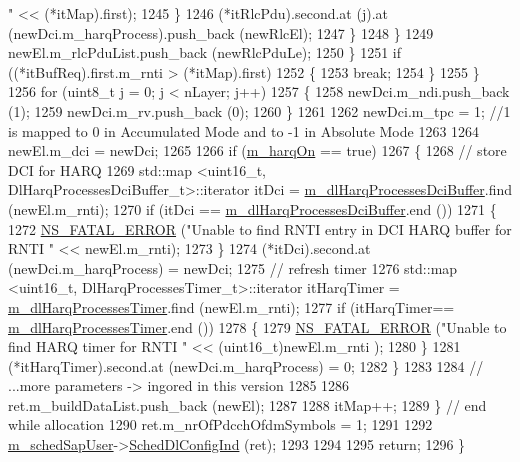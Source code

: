 \begin{DoxyCode}
{      "} << (*itMap).first);
1245                         \}
1246                       (*itRlcPdu).second.at (j).at (newDci.m\_harqProcess).push\_back (newRlcEl);
1247                     \}
1248                 \}
1249               newEl.m\_rlcPduList.push\_back (newRlcPduLe);
1250             \}
1251           \textcolor{keywordflow}{if} ((*itBufReq).first.m\_rnti > (*itMap).first)
1252             \{
1253               \textcolor{keywordflow}{break};
1254             \}
1255         \}
1256       \textcolor{keywordflow}{for} (uint8\_t j = 0; j < nLayer; j++)
1257         \{
1258           newDci.m\_ndi.push\_back (1);
1259           newDci.m\_rv.push\_back (0);
1260         \}
1261 
1262       newDci.m\_tpc = 1; \textcolor{comment}{//1 is mapped to 0 in Accumulated Mode and to -1 in Absolute Mode}
1263 
1264       newEl.m\_dci = newDci;
1265 
1266       \textcolor{keywordflow}{if} (\hyperlink{classns3_1_1FdMtFfMacScheduler_abc95b8f62ff797ff3fb9ed21322c5f35}{m\_harqOn} == \textcolor{keyword}{true})
1267         \{
1268           \textcolor{comment}{// store DCI for HARQ}
1269           std::map <uint16\_t, DlHarqProcessesDciBuffer\_t>::iterator itDci = 
      \hyperlink{classns3_1_1FdMtFfMacScheduler_a8c331acf0a47c5bfe7d8ac19db83d814}{m\_dlHarqProcessesDciBuffer}.find (newEl.m\_rnti);
1270           \textcolor{keywordflow}{if} (itDci == \hyperlink{classns3_1_1FdMtFfMacScheduler_a8c331acf0a47c5bfe7d8ac19db83d814}{m\_dlHarqProcessesDciBuffer}.end ())
1271             \{
1272               \hyperlink{group__fatal_ga5131d5e3f75d7d4cbfd706ac456fdc85}{NS\_FATAL\_ERROR} (\textcolor{stringliteral}{"Unable to find RNTI entry in DCI HARQ buffer for RNTI "} << 
      newEl.m\_rnti);
1273             \}
1274           (*itDci).second.at (newDci.m\_harqProcess) = newDci;
1275           \textcolor{comment}{// refresh timer}
1276           std::map <uint16\_t, DlHarqProcessesTimer\_t>::iterator itHarqTimer =  
      \hyperlink{classns3_1_1FdMtFfMacScheduler_ae68e481ecd9623d2eb74461160c8543b}{m\_dlHarqProcessesTimer}.find (newEl.m\_rnti);
1277           \textcolor{keywordflow}{if} (itHarqTimer== \hyperlink{classns3_1_1FdMtFfMacScheduler_ae68e481ecd9623d2eb74461160c8543b}{m\_dlHarqProcessesTimer}.end ())
1278             \{
1279               \hyperlink{group__fatal_ga5131d5e3f75d7d4cbfd706ac456fdc85}{NS\_FATAL\_ERROR} (\textcolor{stringliteral}{"Unable to find HARQ timer for RNTI "} << (uint16\_t)newEl.m\_rnti
      );
1280             \}
1281           (*itHarqTimer).second.at (newDci.m\_harqProcess) = 0;
1282         \}
1283 
1284       \textcolor{comment}{// ...more parameters -> ingored in this version}
1285 
1286       ret.m\_buildDataList.push\_back (newEl);
1287 
1288       itMap++;
1289     \} \textcolor{comment}{// end while allocation}
1290   ret.m\_nrOfPdcchOfdmSymbols = 1;   
1291 
1292   \hyperlink{classns3_1_1FdMtFfMacScheduler_ac856cbc41e5ac4e78562686fd29ba873}{m\_schedSapUser}->\hyperlink{classns3_1_1FfMacSchedSapUser_a28f8484af5a32a45ee6c0e51770d83f7}{SchedDlConfigInd} (ret);
1293 
1294 
1295   \textcolor{keywordflow}{return};
1296 \}
\end{DoxyCode}


